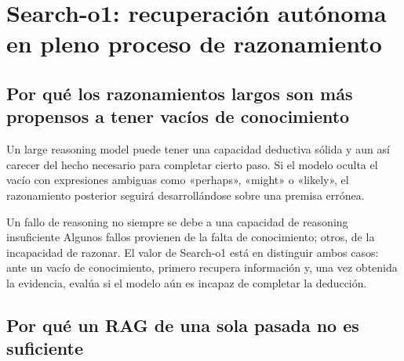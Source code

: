 \section{Search-o1: recuperación autónoma en pleno proceso de razonamiento}

\subsection{Por qué los razonamientos largos son más propensos a tener vacíos de conocimiento}



Un large reasoning model puede tener una capacidad deductiva sólida y aun así carecer del hecho necesario para completar cierto paso. Si el modelo oculta el vacío con expresiones ambiguas como «perhaps», «might» o «likely», el razonamiento posterior seguirá desarrollándose sobre una premisa errónea.

\begin{importantbox}{Un fallo de reasoning no siempre se debe a una capacidad de reasoning insuficiente}
Algunos fallos provienen de la falta de conocimiento; otros, de la incapacidad de razonar. El valor de Search-o1 está en distinguir ambos casos: ante un vacío de conocimiento, primero recupera información y, una vez obtenida la evidencia, evalúa si el modelo aún es incapaz de completar la deducción.
\end{importantbox}

\subsection{Por qué un RAG de una sola pasada no es suficiente}


